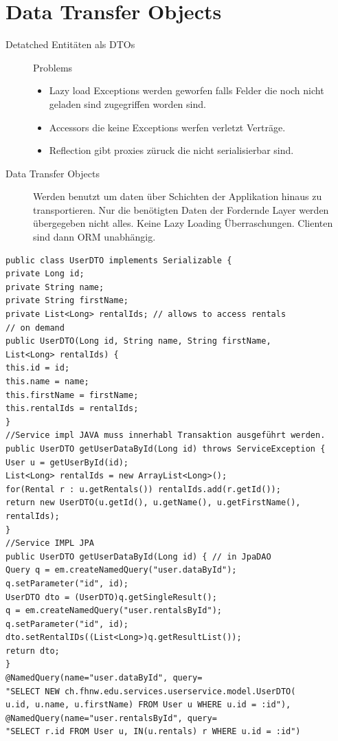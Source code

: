\documentclass[a4paper,10pt]{scrreprt}
\begin{document}
\chapter{Data Transfer Objects}
\begin{description}
 \item [Detatched Entitäten als DTOs] Problems\\
 \begin{itemize}
  \item Lazy load Exceptions werden geworfen falls Felder die noch nicht geladen sind zugegriffen worden sind.
  \item Accessors die keine Exceptions werfen verletzt Verträge.
   \item Reflection gibt proxies züruck die nicht serialisierbar sind.
  \end{itemize}
\item[Data Transfer Objects] Werden benutzt um daten über Schichten der Applikation hinaus zu transportieren. Nur die 
benötigten Daten der Fordernde Layer werden übergegeben nicht alles. Keine Lazy Loading Überraschungen. Clienten sind 
dann ORM unabhängig.
\end{description}
\begin{lstlisting}[caption= DTO Beispiel]
 public class UserDTO implements Serializable {
private Long id;
private String name;
private String firstName;
private List<Long> rentalIds; // allows to access rentals
// on demand
public UserDTO(Long id, String name, String firstName,
List<Long> rentalIds) {
this.id = id;
this.name = name;
this.firstName = firstName;
this.rentalIds = rentalIds;
}
//Service impl JAVA muss innerhabl Transaktion ausgeführt werden.
public UserDTO getUserDataById(Long id) throws ServiceException {
User u = getUserById(id);
List<Long> rentalIds = new ArrayList<Long>();
for(Rental r : u.getRentals()) rentalIds.add(r.getId());
return new UserDTO(u.getId(), u.getName(), u.getFirstName(),
rentalIds);
}
//Service IMPL JPA
public UserDTO getUserDataById(Long id) { // in JpaDAO
Query q = em.createNamedQuery("user.dataById");
q.setParameter("id", id);
UserDTO dto = (UserDTO)q.getSingleResult();
q = em.createNamedQuery("user.rentalsById");
q.setParameter("id", id);
dto.setRentalIDs((List<Long>)q.getResultList());
return dto;
}
@NamedQuery(name="user.dataById", query=
"SELECT NEW ch.fhnw.edu.services.userservice.model.UserDTO(
u.id, u.name, u.firstName) FROM User u WHERE u.id = :id"),
@NamedQuery(name="user.rentalsById", query=
"SELECT r.id FROM User u, IN(u.rentals) r WHERE u.id = :id")
\end{lstlisting}
\end{document}

